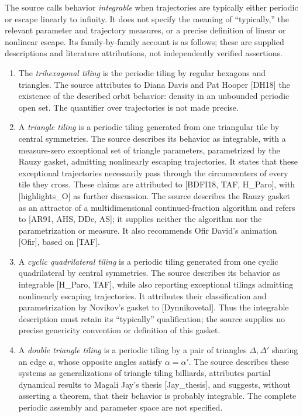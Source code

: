 \documentclass[11pt]{article}
\begin{document}
The source calls behavior \emph{integrable} when trajectories are typically either periodic or escape linearly to infinity. It does not specify the meaning of ``typically,'' the relevant parameter and trajectory measures, or a precise definition of linear or nonlinear escape. Its family-by-family account is as follows; these are supplied descriptions and literature attributions, not independently verified assertions.
\begin{enumerate}
\item The \emph{trihexagonal tiling} is the periodic tiling by regular hexagons and triangles. The source attributes to Diana Davis and Pat Hooper [DH18] the existence of the described orbit behavior: density in an unbounded periodic open set. The quantifier over trajectories is not made precise.
\item A \emph{triangle tiling} is a periodic tiling generated from one triangular tile by central symmetries. The source describes its behavior as integrable, with a measure-zero exceptional set of triangle parameters, parametrized by the Rauzy gasket, admitting nonlinearly escaping trajectories. It states that these exceptional trajectories necessarily pass through the circumcenters of every tile they cross. These claims are attributed to [BDFI18, TAF, H\_Paro], with [highlights\_O] as further discussion. The source describes the Rauzy gasket as an attractor of a multidimensional continued-fraction algorithm and refers to [AR91, AHS, DDe, AS]; it supplies neither the algorithm nor the parametrization or measure. It also recommends Ofir David's animation [Ofir], based on [TAF].
\item A \emph{cyclic quadrilateral tiling} is a periodic tiling generated from one cyclic quadrilateral by central symmetries. The source describes its behavior as integrable [H\_Paro, TAF], while also reporting exceptional tilings admitting nonlinearly escaping trajectories. It attributes their classification and parametrization by Novikov's gasket to [Dynnikovetal]. Thus the integrable description must retain its ``typically'' qualification; the source supplies no precise genericity convention or definition of this gasket.
\item A \emph{double triangle tiling} is a periodic tiling by a pair of triangles \(\Delta,\Delta'\) sharing an edge \(a\), whose opposite angles satisfy \(\alpha=\alpha'\). The source describes these systems as generalizations of triangle tiling billiards, attributes partial dynamical results to Magali Jay's thesis [Jay\_thesis], and suggests, without asserting a theorem, that their behavior is probably integrable. The complete periodic assembly and parameter space are not specified.

\end{enumerate}
\end{document}
